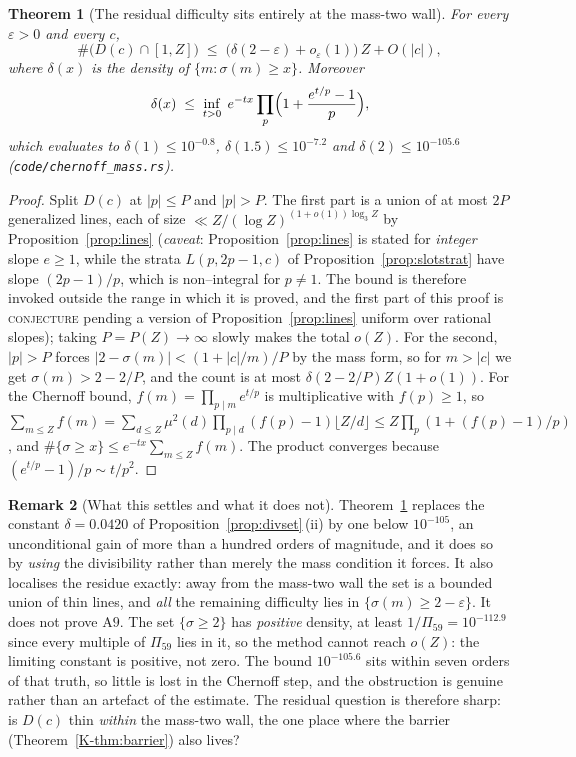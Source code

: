 \documentclass[11pt]{article}
\newtheorem{theorem}{Theorem}[section]
\theoremstyle{definition}
\newtheorem{remark}[theorem]{Remark}
\begin{document}
\begin{theorem}[The residual difficulty sits entirely at the mass-two wall]\label{thm:masstwo}
For every $\varepsilon>0$ and every $c$,
\[ \#\bigl(D(c)\cap[1,Z]\bigr)\;\le\;\bigl(\delta(2-\varepsilon)+o_\varepsilon(1)\bigr)\,Z+O(|c|), \]
where $\delta(x)$ is the density of $\{m:\sigma(m)\ge x\}$. Moreover
\[ \delta(x)\;\le\;\inf_{t>0}\;e^{-tx}\prod_{p}\Bigl(1+\frac{e^{t/p}-1}{p}\Bigr), \]
which evaluates to $\delta(1)\le10^{-0.8}$, $\delta(1.5)\le10^{-7.2}$ and
$\delta(2)\le10^{-105.6}$ \textup{(\texttt{code/chernoff\_mass.rs})}.
\end{theorem}
\begin{proof}
Split $D(c)$ at $|p|\le P$ and $|p|>P$. The first part is a union of at most $2P$ generalized lines,
each of size $\ll Z/(\log Z)^{(1+o(1))\log_3 Z}$ by Proposition~\ref{prop:lines}
\textup{(}\emph{caveat}: Proposition~\ref{prop:lines} is stated for \emph{integer} slope $e\ge1$,
while the strata $L(p,2p-1,c)$ of Proposition~\ref{prop:slotstrat} have slope $(2p-1)/p$, which is
non--integral for $p\ne1$. The bound is therefore invoked outside the range in which it is proved,
and the first part of this proof is \textsc{conjecture} pending a version of
Proposition~\ref{prop:lines} uniform over rational slopes\textup{)}; taking
$P=P(Z)\to\infty$ slowly makes the total $o(Z)$. For the second, $|p|>P$ forces
$|2-\sigma(m)|<(1+|c|/m)/P$ by the mass form, so for $m>|c|$ we get $\sigma(m)>2-2/P$, and the count
is at most $\delta(2-2/P)Z(1+o(1))$. For the Chernoff bound, $f(m)=\prod_{p\mid m}e^{t/p}$ is
multiplicative with $f(p)\ge1$, so
$\sum_{m\le Z}f(m)=\sum_{d\le Z}\mu^2(d)\prod_{p\mid d}(f(p)-1)\lfloor Z/d\rfloor
\le Z\prod_p(1+(f(p)-1)/p)$, and $\#\{\sigma\ge x\}\le e^{-tx}\sum_{m\le Z}f(m)$.
The product converges because $(e^{t/p}-1)/p\sim t/p^2$.
\end{proof}

\begin{remark}[What this settles and what it does not]\label{rem:masstwo}
Theorem~\ref{thm:masstwo} replaces the constant $\delta=0.0420$ of
Proposition~\ref{prop:divset}\,(ii) by one below $10^{-105}$, an unconditional gain of more than a
hundred orders of magnitude, and it does so by \emph{using} the divisibility rather than merely the
mass condition it forces. It also localises the residue exactly: away from the mass-two wall the set
is a bounded union of thin lines, and \emph{all} the remaining difficulty lies in
$\{\sigma(m)\ge2-\varepsilon\}$. It does not prove $\mathrm{A}9$. The set $\{\sigma\ge2\}$ has
\emph{positive} density, at least $1/\Pi_{59}=10^{-112.9}$ since every multiple of $\Pi_{59}$ lies
in it, so the method cannot reach $o(Z)$: the limiting constant is positive, not zero. The bound
$10^{-105.6}$ sits within seven orders of that truth, so little is lost in the Chernoff step, and the
obstruction is genuine rather than an artefact of the estimate. The residual question is therefore
sharp: is $D(c)$ thin \emph{within} the mass-two wall, the one place where the barrier
\textup{(Theorem~\ref{K-thm:barrier})} also lives?
\end{remark}
\end{document}
